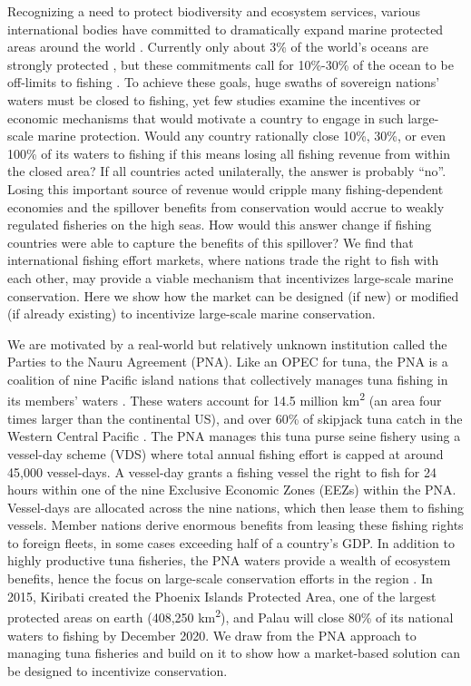 \documentclass[12pt]{article}
\begin{document}
Recognizing a need to protect biodiversity and ecosystem services, various international bodies have committed to dramatically expand marine protected areas around the world \cite{oleary_2016}. Currently only about 3\% of the world's oceans are strongly protected \cite{sala_2018}, but these commitments call for 10\%-30\% of the ocean to be off-limits to fishing \cite{oleary_2016,dinerstein_2019}. To achieve these goals, huge swaths of sovereign nations' waters must be closed to fishing, yet few studies examine the incentives or economic mechanisms that would motivate a country to engage in such large-scale marine protection. Would any country rationally close 10\%, 30\%, or even 100\% of its waters to fishing if this means losing all fishing revenue from within the closed area? If all countries acted unilaterally, the answer is probably ``no''. Losing this important source of revenue would cripple many fishing-dependent economies and the spillover benefits from conservation would accrue to weakly regulated fisheries on the high seas. How would this answer change if fishing countries were able to capture the benefits of this spillover?  We find that international fishing effort markets, where nations trade the right to fish with each other, may provide a viable mechanism that incentivizes large-scale marine conservation. Here we show how the market can be designed (if new) or modified (if already existing) to incentivize large-scale marine conservation.

We are motivated by a real-world but relatively unknown institution called the Parties to the Nauru Agreement (PNA). Like an OPEC for tuna, the PNA is a coalition of nine Pacific island nations that collectively manages tuna fishing in its members' waters \cite{havice_2013,aqorau_2018}. These waters account for 14.5 million km\textsuperscript{2} (an area four times larger than the continental US), and over 60\% of skipjack tuna catch in the Western Central Pacific \cite{havice_2013}. The PNA manages this tuna purse seine fishery using a vessel-day scheme (VDS) where total annual fishing effort is capped at around 45,000 vessel-days. A vessel-day grants a fishing vessel the right to fish for 24 hours within one of the nine Exclusive Economic Zones (EEZs) within the PNA. Vessel-days are allocated across the nine nations, which then lease them to fishing vessels. Member nations derive enormous benefits from leasing these fishing rights to foreign fleets, in some cases exceeding half of a country's GDP. In addition to highly productive tuna fisheries, the PNA waters provide a wealth of ecosystem benefits, hence the focus on large-scale conservation efforts in the region \cite{mcleod_2019}. In 2015, Kiribati created the Phoenix Islands Protected Area, one of the largest protected areas on earth (408,250 km\textsuperscript{2}), and Palau will close 80\% of its national waters to fishing by December 2020. We draw from the PNA approach to managing tuna fisheries and build on it to show how a market-based solution can be designed to incentivize conservation.
\end{document}

